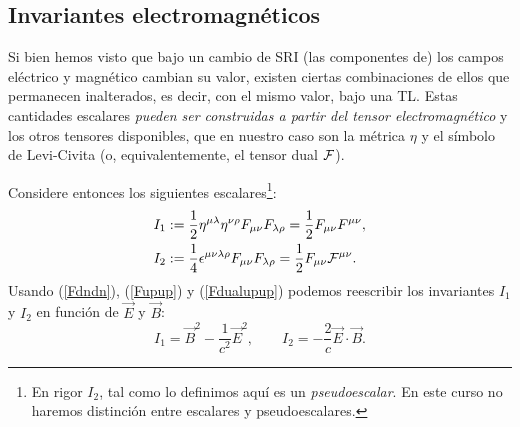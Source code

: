 

\subsection{Invariantes electromagnéticos}

Si bien hemos visto que bajo un cambio de SRI (las componentes de) los campos
eléctrico y magnético cambian su valor, existen ciertas combinaciones de ellos que permanecen inalterados, es decir, con el mismo valor, bajo una TL. Estas cantidades escalares \textit{pueden ser construidas a partir del tensor electromagnético} y los otros tensores disponibles, que en nuestro caso son la métrica $\eta$ y el símbolo de Levi-Civita (o, equivalentemente, el tensor dual $\cal F$).

Considere entonces los siguientes escalares\footnote{En rigor $I_2$, tal como lo definimos aquí es un \textit{pseudoescalar}. En este curso no haremos
distinción entre escalares y pseudoescalares.}:
\begin{align}
I_1 & :=\frac{1}{2}\eta^{\mu\lambda}\eta^{\nu\rho}F_{\mu\nu}F_{\lambda\rho}=\frac{1}{2}F_{\mu\nu}F^{\mu\nu},\\
I_2 & :=\frac{1}{4}\epsilon^{\mu\nu\lambda\rho}F_{\mu\nu}F_{\lambda\rho}
= \frac{1}{2}F_{\mu\nu}{\cal F}^{\mu\nu}.
\end{align}
Usando (\ref{Fdndn}), (\ref{Fupup}) y (\ref{Fdualupup}) podemos reescribir los invariantes $I_1$ y $I_2$ en función de $\vec{E}$ y $\vec{B}$:
\begin{equation}
I_1=\vec{B}^2-\frac{1}{c^2}\vec{E}^2, \qquad I_2  =-\frac{2}{c}\vec{E}\cdot\vec{B}.
\end{equation}

